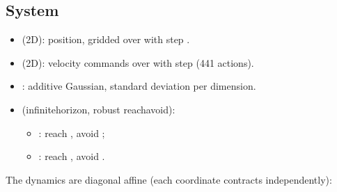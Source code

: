 \documentclass[a4paper,10pt,english]{sphinxmanual}
\begin{document}
\subsection{System}
\label{\detokenize{benchmarks/PD:system}}\begin{itemize}
\item {} 
\sphinxAtStartPar
{} (2D): position, gridded over  with step .

\item {} 
\sphinxAtStartPar
{} (2D): velocity commands over  with step 
(441 actions).

\item {} 
\sphinxAtStartPar
{}: additive Gaussian, standard deviation  per dimension.

\item {} 
\sphinxAtStartPar
{} (infinite\sphinxhyphen{}horizon, robust reach\sphinxhyphen{}avoid):
\begin{itemize}
\item {} 
\sphinxAtStartPar
{}: reach , avoid ;

\item {} 
\sphinxAtStartPar
{}: reach , avoid .

\end{itemize}

\end{itemize}

\sphinxAtStartPar
The dynamics are diagonal affine (each coordinate contracts independently):
\end{document}
